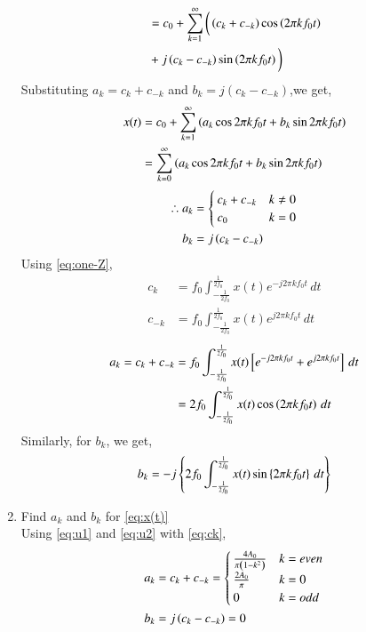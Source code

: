 \documentclass[journal,12pt,twocolumn]{IEEEtran}
\renewcommand\thesection{\arabic{section}}
\begin{document}
\begin{enumerate}[label=\thesection.\arabic*,ref=\thesection.\theenumi]
\begin{align}
			&=c_0+\sum_{k = 1}^{\infty}\bigg(\left(c_k+c_{-k}\right)\cos\left(2\pi kf_0 t\right)\\ &+j\left(c_k-c_{-k}\right)\sin\left(2\pi kf_0 t\right)\bigg)
		\end{align}
		Substituting $a_k=c_{k} + c_{-k}$ and $b_k=j(c_{k}-c_{-k})$,we get,
		\begin{align}
			x(t)&=c_0+    \sum_{k = 1}^{\infty}\left(a_k\cos{2\pi kf_0 t}+b_k\sin{2\pi kf_0 t}\right)\\
			&=\sum_{k = 0}^{\infty}\left(a_k\cos{2\pi kf_0 t}+b_k\sin{2\pi kf_0 t}\right)
		\end{align}
		\begin{align}
			\label{eq:u1}
			\therefore a_k&=
			\begin{cases}
				c_k+c_{-k}&k\neq0
				\\
				c_0&k=0
			\end{cases}\\
			\label{eq:u2}
			b_k&=j\left(c_k-c_{-k}\right)
		\end{align}
		Using \eqref{eq:one-Z},
		\begin{align}
			c_k &= f_0\int_{-\frac{1}{2f_0}}^{\frac{1}{2f_0}}x(t)e^{-j2\pi kf_0 t}\, dt\\
			c_{-k} &= f_0\int_{-\frac{1}{2f_0}}^{\frac{1}{2f_0}}x(t)e^{j2\pi kf_0 t}\, dt\end{align}
		\begin{align}
			a_k=c_k+c_{-k}&= f_0\int_{-\frac{1}{2f_0}}^{\frac{1}{2f_0}}x(t){}\left[e^{-j2\pi kf_0 t}+e^{j2\pi kf_0 t}\right]\, dt\\
			&=2f_0\int_{-\frac{1}{2f_0}}^{\frac{1}{2f_0}}x(t)\cos\left(2\pi kf_0t\right)\, dt
		\end{align}
		Similarly, for $b_k$, we get,
		\begin{align}
			b_k=-j\left\{2f_0\int_{-\frac{1}{2f_0}}^{\frac{1}{2f_0}}x(t)\sin\left\{2\pi kf_0t\right\}\, dt\right\}
		\end{align}
		\item Find $a_k$ and $b_k$ for 
		\eqref{eq:x(t)}\\
		\solution
		Using \eqref{eq:u1} and \eqref{eq:u2} with \eqref{eq:ck},
		\begin{align}
			a_k&=c_k+c_{-k}=\begin{cases}
				\frac{4A_0}{\pi\left(1-k^2\right)}&k=even
				\\
				\frac{2A_0}{\pi}&k=0
				\\
				0&k=odd
			\end{cases}\\
			b_k&=j\left(c_k-c_{-k}\right)=0
		\end{align}

\end{enumerate}
\end{document}
